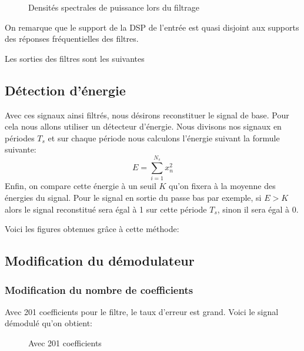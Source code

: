 \documentclass{article}
\begin{document}
\begin{figure}[H]
	\centering
	
	\caption{Densités spectrales de puissance lors du filtrage}
	\label{fig:filtrage-dsps}
\end{figure}

On remarque que le support de la DSP de l'entrée est quasi disjoint aux supports des réponses fréquentielles des filtres.



Les sorties des filtres sont les suivantes



\subsection{Détection d'énergie}


Avec ces signaux ainsi filtrés, nous désirons reconstituer le signal de base. Pour cela nous allons utiliser un détecteur d'énergie.
Nous divisons nos signaux en périodes $T_s$ et sur chaque période nous calculons l'énergie suivant la formule suivante:
\[
E=\sum_{i=1}^{N_s} x_n^2
\]
Enfin, on compare cette énergie à un seuil $K$ qu'on fixera à la moyenne des énergies du signal.
Pour le signal en sortie du passe bas par exemple, si $E>K$ alors le signal reconstitué sera égal à 1 sur cette période $T_s$, sinon il sera égal à 0.

Voici les figures obtenues grâce à cette méthode:

\begin{figure}
	\centering
	
\end{figure}



\subsection{Modification du démodulateur} 

\subsubsection{Modification du nombre de coefficients}

Avec 201 coefficients pour le filtre, le taux d'erreur est grand.
Voici le signal démodulé qu'on obtient:

\begin{figure}[H]
	\centering
	
	\caption{Avec 201 coefficients}
	\label{fig:201-coefficients}
\end{figure}
\end{document}
